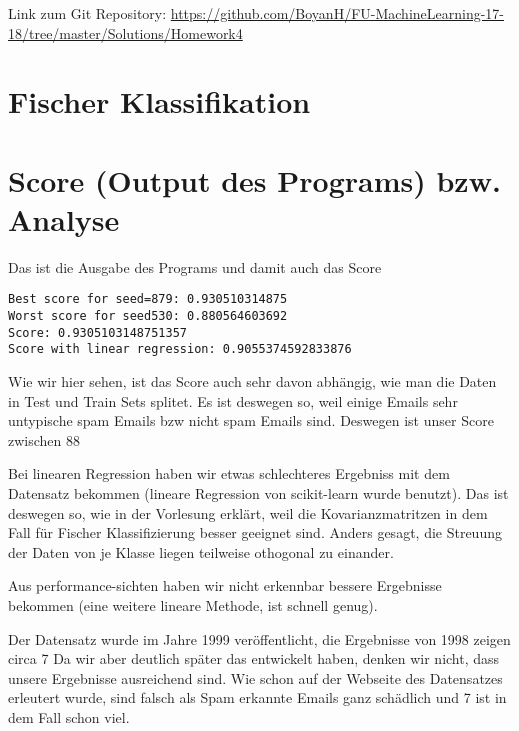 \usepackage{graphicx}
\usepackage{amsmath}
\usepackage{amssymb}
\usepackage{fancyvrb}

\newcommand{\dozent}{Prof. R. Rojas}					%
\newcommand{\projectNo}{4}
\newcommand{\veranstaltung}{Mustererkennung}
\newcommand{\semester}{WS17/18}
\newcommand{\studenten}{Boyan Hristov, Nedeltscho Petrov}





Link zum Git Repository: \url{https://github.com/BoyanH/FU-MachineLearning-17-18/tree/master/Solutions/Homework\projectNo}

\section*{Fischer Klassifikation}


\section*{Score (Output des Programs) bzw. Analyse}
Das ist die Ausgabe des Programs und damit auch das Score
\begin{lstlisting}
Best score for seed=879: 0.930510314875
Worst score for seed530: 0.880564603692
Score: 0.9305103148751357
Score with linear regression: 0.9055374592833876
\end{lstlisting}

Wie wir hier sehen, ist das Score auch sehr davon abhängig, wie man die Daten in Test und Train Sets
splitet. Es ist deswegen so, weil einige Emails sehr untypische spam Emails bzw nicht spam Emails sind.
Deswegen ist unser Score zwischen 88%

Bei linearen Regression haben wir etwas schlechteres Ergebniss mit dem Datensatz bekommen (lineare Regression von
scikit-learn wurde benutzt). Das ist deswegen so, wie in der Vorlesung erklärt, weil die Kovarianzmatritzen in dem
Fall für Fischer Klassifizierung besser geeignet sind. Anders gesagt, die Streuung der Daten von je Klasse liegen
teilweise othogonal zu einander.

Aus performance-sichten haben wir nicht erkennbar bessere Ergebnisse bekommen (eine weitere lineare Methode, ist
schnell genug).

Der Datensatz wurde im Jahre 1999 veröffentlicht, die Ergebnisse von 1998 zeigen circa 7%
Da wir aber deutlich später das entwickelt haben, denken wir nicht, dass unsere Ergebnisse ausreichend sind. Wie schon
auf der Webseite des Datensatzes erleutert wurde, sind falsch als Spam erkannte Emails ganz schädlich und 7%
ist in dem Fall schon viel.

